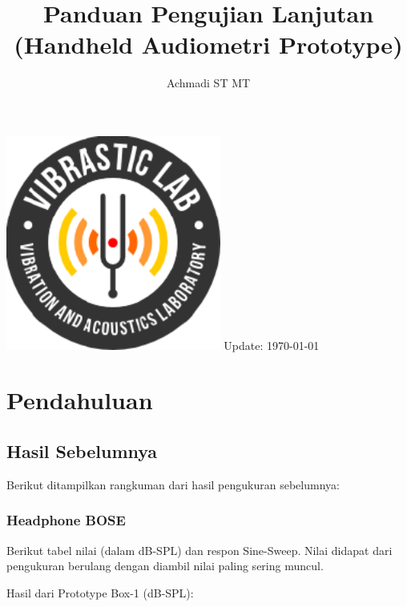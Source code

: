 \documentclass[12pt,]{article}
\title{\LARGE \bf
        Panduan Pengujian Lanjutan\\
        \small{(Handheld Audiometri Prototype)}
}
\author{Achmadi ST MT}
\date{}
\begin{document}
	\thispagestyle{empty}
	
	\begin{titlepage}
		\centering
		\vfill
		\vfill
		\maketitle
		\vfill
		\includegraphics[width=200pt]{images/logo/logoviblab}
		\vfill
		\vfill
		Update: {\today} \currenttime \\
	\end{titlepage}
	
	
	\newpage
	\tableofcontents
	
	
	\newpage
	\section{Pendahuluan}
	
	\subsection{Hasil Sebelumnya}
	
	Berikut ditampilkan rangkuman dari hasil pengukuran sebelumnya:
	
	\subsubsection{Headphone BOSE}
	
	Berikut tabel nilai (dalam dB-SPL) dan respon Sine-Sweep.
	Nilai didapat dari pengukuran berulang dengan diambil nilai paling sering muncul.
	
	Hasil dari Prototype Box-1 (dB-SPL):
	
\end{document}
